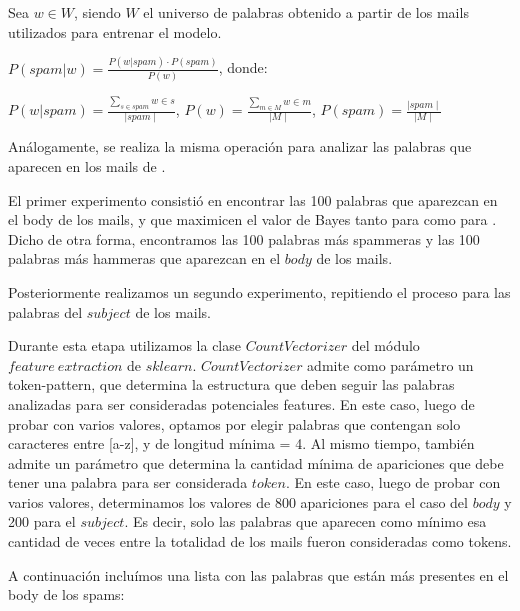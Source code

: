 Sea $w \in W$, siendo $W$ el universo de palabras obtenido a partir de los mails utilizados para entrenar el modelo.

\vspace{5px}
$P(spam \vert w) = \frac{P(w \vert spam) \cdot P(spam)}{P(w)}$, donde:

\vspace{5px}
$P(w \vert spam) = \frac{\sum_{s \in spam}^{} w \in s}{\mid spam \mid}$, $P(w) = \frac{\sum_{m \in M}^{} w \in m}{\mid M \mid}$, $P(spam) = \frac{\mid spam \mid}{\mid M \mid}$

\vspace{5px}
Análogamente, se realiza la misma operación para analizar las palabras que aparecen en los mails de \ham{}.

El primer experimento consistió en encontrar las 100 palabras que aparezcan en el body de los mails, y que maximicen el valor de Bayes tanto para \spam{} como
para \ham{}. Dicho de otra forma, encontramos las 100 palabras más spammeras y las 100 palabras más hammeras que aparezcan en el \(body\) de los mails.

Posteriormente realizamos un segundo experimento, repitiendo el proceso para las palabras del \(subject\) de los mails.

Durante esta etapa utilizamos la clase \(CountVectorizer\) del módulo \(feature \ extraction\) de \(sklearn\). \(CountVectorizer\) admite como parámetro un token-pattern,
que determina la estructura que deben seguir las palabras analizadas para ser consideradas potenciales features. En este caso, luego de probar con varios valores, optamos
por elegir palabras que contengan solo caracteres entre [a-z], y de longitud mínima = 4. Al mismo tiempo, también admite un parámetro que determina
la cantidad mínima de apariciones que debe tener una palabra para ser considerada \(token\). En este caso, luego de probar con varios valores, determinamos los valores de
800 apariciones para el caso del \(body\) y 200 para el \(subject\). Es decir, solo las palabras que aparecen como mínimo esa cantidad de veces entre la totalidad de
los mails fueron consideradas como tokens.

A continuación incluímos una lista con las palabras que están más presentes en el body de los spams:

\noindent{}
